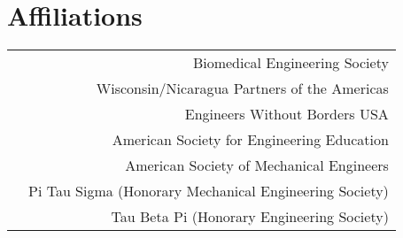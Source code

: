 \section*{Affiliations}
\begin{tabular}{L!{\VRule}R}
&Biomedical Engineering Society\\
&Wisconsin/Nicaragua Partners of the Americas\\
&Engineers Without Borders USA\\
&American Society for Engineering Education\\
&American Society of Mechanical Engineers\\
&Pi Tau Sigma (Honorary Mechanical Engineering Society)\\
&Tau Beta Pi (Honorary Engineering Society)\\
\end{tabular}